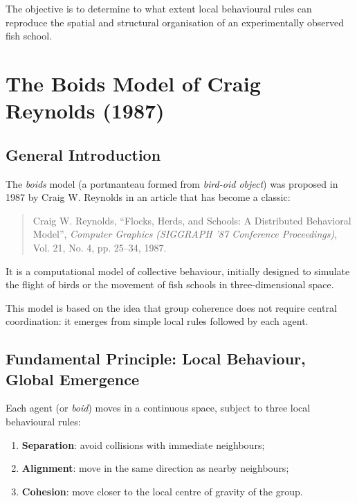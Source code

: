 \documentclass[10pt,a4paper]{article}
\newcommand{\esp}{\vspace*{2\bigskipamount}}
\begin{document}
The objective is to determine to what extent
local behavioural rules can reproduce the
spatial and structural organisation of an
experimentally observed fish school.

\esp


\section{The Boids Model of Craig Reynolds (1987)}

\subsection{General Introduction}

The \emph{boids} model (a portmanteau formed from
\emph{bird-oid object}) was proposed in 1987 by
Craig W. Reynolds in an article that has become
a classic:

\begin{quote}
Craig W. Reynolds,
``Flocks, Herds, and Schools:
A Distributed Behavioral Model'',
\emph{Computer Graphics
(SIGGRAPH '87 Conference Proceedings)},
Vol. 21, No. 4, pp. 25--34, 1987.
\end{quote}

It is a computational model of collective behaviour,
initially designed to simulate the flight of birds
or the movement of fish schools in three-dimensional
space.

This model is based on the idea that group coherence
does not require central coordination:
it emerges from simple local rules followed
by each agent.

\subsection{Fundamental Principle:
Local Behaviour, Global Emergence}

Each agent (or \emph{boid}) moves in a continuous
space, subject to three local behavioural rules:

\begin{enumerate}
    \item \textbf{Separation}:
    avoid collisions with immediate neighbours;

    \item \textbf{Alignment}:
    move in the same direction as nearby neighbours;

    \item \textbf{Cohesion}:
    move closer to the local centre of gravity
    of the group.
\end{enumerate}
\end{document}
